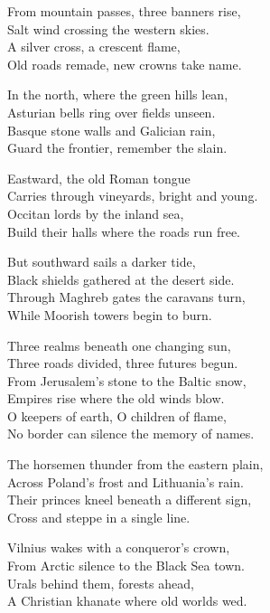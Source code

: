 \begin{lyrics}
From mountain passes, three banners rise,\\
Salt wind crossing the western skies.\\
A silver cross, a crescent flame,\\
Old roads remade, new crowns take name.

In the north, where the green hills lean,\\
Asturian bells ring over fields unseen.\\
Basque stone walls and Galician rain,\\
Guard the frontier, remember the slain.

Eastward, the old Roman tongue\\
Carries through vineyards, bright and young.\\
Occitan lords by the inland sea,\\
Build their halls where the roads run free.

But southward sails a darker tide,\\
Black shields gathered at the desert side.\\
Through Maghreb gates the caravans turn,\\
While Moorish towers begin to burn.

Three realms beneath one changing sun,\\
Three roads divided, three futures begun.\\
From Jerusalem’s stone to the Baltic snow,\\
Empires rise where the old winds blow.\\
O keepers of earth, O children of flame,\\
No border can silence the memory of names.

The horsemen thunder from the eastern plain,\\
Across Poland’s frost and Lithuania’s rain.\\
Their princes kneel beneath a different sign,\\
Cross and steppe in a single line.

Vilnius wakes with a conqueror’s crown,\\
From Arctic silence to the Black Sea town.\\
Urals behind them, forests ahead,\\
A Christian khanate where old worlds wed.


\end{lyrics}

